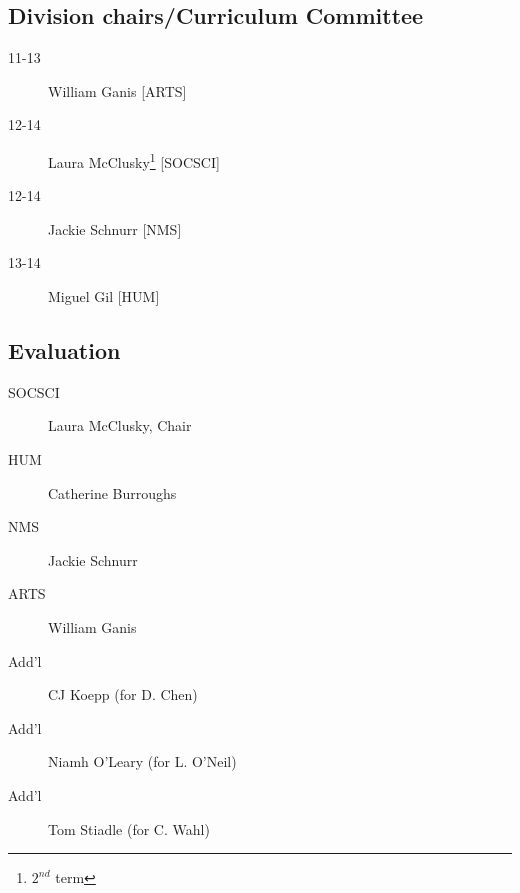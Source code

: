 \documentclass[10pt, twocolumn]{amsart}
\newcommand{\noteDivision}[1]{ [#1]}
\begin{document}
\subsection*{Division chairs/Curriculum Committee}
\begin{description}
\item[11-13] William Ganis \noteDivision{ARTS}
\item[12-14] Laura McClusky\footnote{$2^{nd}$ term} \noteDivision{SOCSCI}
\item[12-14] Jackie Schnurr \noteDivision{NMS}
\item[13-14] Miguel Gil \noteDivision{HUM}
\end{description}

\subsection*{Evaluation}
\begin{description}
\item[SOCSCI] Laura McClusky, Chair
\item[HUM] Catherine Burroughs 
\item[NMS] Jackie Schnurr
\item[ARTS] William Ganis
\item[Add'l] CJ Koepp (for D. Chen)
\item[Add'l] Niamh O'Leary (for L. O'Neil)
\item[Add'l] Tom Stiadle (for C. Wahl)
\end{description}

%
\pagebreak
\end{document}
